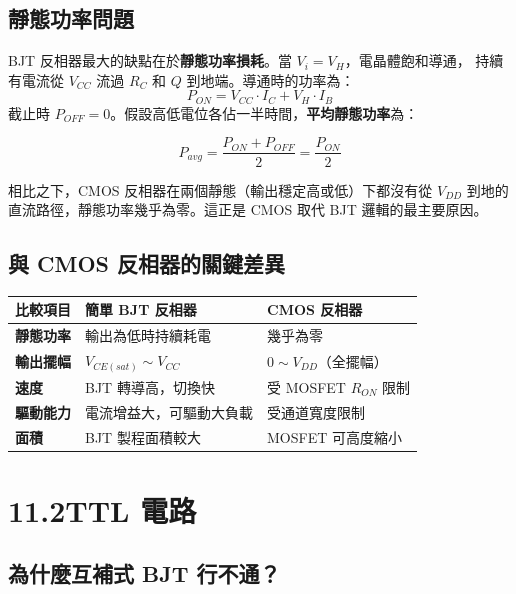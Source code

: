 \documentclass[12pt]{article}
\begin{document}
\subsection*{靜態功率問題}

BJT 反相器最大的缺點在於\textbf{靜態功率損耗}。當 $V_i = V_H$，電晶體飽和導通，
持續有電流從 $V_{CC}$ 流過 $R_C$ 和 $Q$ 到地端。導通時的功率為：
\[
P_{ON} = V_{CC} \cdot I_C + V_H \cdot I_B
\]
截止時 $P_{OFF} = 0$。假設高低電位各佔一半時間，\textbf{平均靜態功率}為：

\begin{formulabox}
\[
P_{avg} = \frac{P_{ON} + P_{OFF}}{2} = \frac{P_{ON}}{2}
\]
\end{formulabox}

\noindent
相比之下，CMOS 反相器在兩個靜態（輸出穩定高或低）下都沒有從 $V_{DD}$ 到地的
直流路徑，靜態功率幾乎為零。這正是 CMOS 取代 BJT 邏輯的最主要原因。

\subsection*{與 CMOS 反相器的關鍵差異}

\begin{center}
\renewcommand{\arraystretch}{1.25}
\begin{tabular}{>{\bfseries}l p{5.2cm} p{5.2cm}}
\toprule
\textbf{比較項目} & \textbf{簡單 BJT 反相器} & \textbf{CMOS 反相器} \\
\midrule
靜態功率 & 輸出為低時持續耗電 & 幾乎為零 \\
輸出擺幅 & $V_{CE(sat)} \sim V_{CC}$ & $0 \sim V_{DD}$（全擺幅）\\
速度 & BJT 轉導高，切換快 & 受 MOSFET $R_{ON}$ 限制 \\
驅動能力 & 電流增益大，可驅動大負載 & 受通道寬度限制 \\
面積 & BJT 製程面積較大 & MOSFET 可高度縮小 \\
\bottomrule
\end{tabular}
\end{center}

\section*{11.2\quad TTL 電路}

\subsection*{為什麼互補式 BJT 行不通？}
\end{document}
